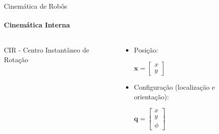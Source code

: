 \documentclass{beamer}
\begin{document}
\begin{frame}{Cinemática de Robôs}
    \framesubtitle{Cinemática Interna}
    \begin{columns}
        \begin{column}[c]{0.5\textwidth}
            \centering
            
        CIR - Centro Instantâneo de Rotação
        \end{column}
        \begin{column}[c]{0.5\textwidth}
            \centering
            \begin{itemize}
                \item Posição:
                      \newline

                      $\mathbf{x} = \begin{bmatrix}
                              x \\
                              y
                          \end{bmatrix}$
                      \newline

                \item Configuração (localização e orientação):
                      \newline

                      $\mathbf{q} =
                          \begin{bmatrix}
                              x \\
                              y \\
                              \phi
                          \end{bmatrix}$
            \end{itemize}
        \end{column}
    \end{columns}
\end{frame}
\end{document}
